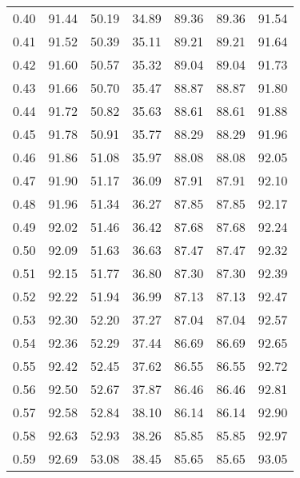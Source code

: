 \begin{tabular}{|c|c|c|c|c|c|c|}
      0.40 &     91.44 &     50.19 &      34.89 &   89.36 &      89.36 &         91.54 \\
      0.41 &     91.52 &     50.39 &      35.11 &   89.21 &      89.21 &         91.64 \\
      0.42 &     91.60 &     50.57 &      35.32 &   89.04 &      89.04 &         91.73 \\
      0.43 &     91.66 &     50.70 &      35.47 &   88.87 &      88.87 &         91.80 \\
      0.44 &     91.72 &     50.82 &      35.63 &   88.61 &      88.61 &         91.88 \\
      0.45 &     91.78 &     50.91 &      35.77 &   88.29 &      88.29 &         91.96 \\
      0.46 &     91.86 &     51.08 &      35.97 &   88.08 &      88.08 &         92.05 \\
      0.47 &     91.90 &     51.17 &      36.09 &   87.91 &      87.91 &         92.10 \\
      0.48 &     91.96 &     51.34 &      36.27 &   87.85 &      87.85 &         92.17 \\
      0.49 &     92.02 &     51.46 &      36.42 &   87.68 &      87.68 &         92.24 \\
      0.50 &     92.09 &     51.63 &      36.63 &   87.47 &      87.47 &         92.32 \\
      0.51 &     92.15 &     51.77 &      36.80 &   87.30 &      87.30 &         92.39 \\
      0.52 &     92.22 &     51.94 &      36.99 &   87.13 &      87.13 &         92.47 \\
      0.53 &     92.30 &     52.20 &      37.27 &   87.04 &      87.04 &         92.57 \\
      0.54 &     92.36 &     52.29 &      37.44 &   86.69 &      86.69 &         92.65 \\
      0.55 &     92.42 &     52.45 &      37.62 &   86.55 &      86.55 &         92.72 \\
      0.56 &     92.50 &     52.67 &      37.87 &   86.46 &      86.46 &         92.81 \\
      0.57 &     92.58 &     52.84 &      38.10 &   86.14 &      86.14 &         92.90 \\
      0.58 &     92.63 &     52.93 &      38.26 &   85.85 &      85.85 &         92.97 \\
      0.59 &     92.69 &     53.08 &      38.45 &   85.65 &      85.65 &         93.05 \\

\end{tabular}
